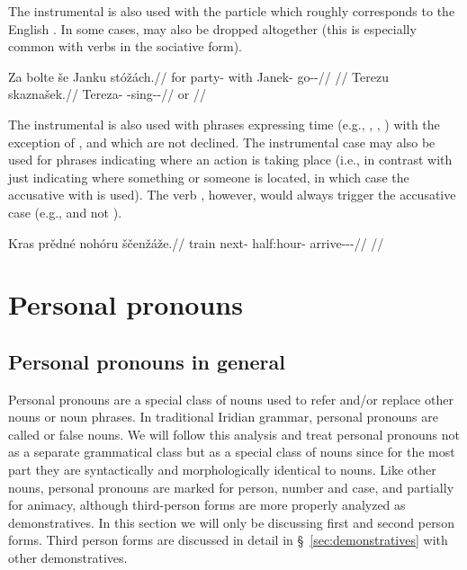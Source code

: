 The instrumental is also used with the particle  which roughly
corresponds to the English . In some cases,  may also be
dropped altogether (this is especially common with verbs in the sociative form).

\pex
\a\begingl
\gla Za bolte še Janku stóžách.//
\glb for party-\Acc{} with Janek-\Ins{} go-\Av{}-\Ctp{}//
\glft {}//
\endgl
\a\begingl
\gla Terezu skaznašek.//
\glb Tereza-\Ins{} \Soc{}-sing-\Av{}-\Pf{}//
\glft {} or //
\endgl
\xe

The instrumental is also used with phrases expressing time (e.g.,
, , ) with the
exception of ,  and
 which are not declined. The instrumental case may also
be used for phrases indicating where an action is taking place (i.e., in
contrast with just indicating where something or someone is located, in which
case the accusative with  is used). The verb , however, would always trigger the accusative case (e.g.,  and not ).

\pex
\begingl
\gla Kras prědné nohóru ščenžáže.//
\glb train next-\Att{} half:hour-\Ins{} arrive-\Av{}-\Ctp{}-\Quot{}//
\glft {}//
\endgl
\xe

\section{Personal pronouns}

\subsection{Personal pronouns in general}

Personal pronouns are a special class of nouns used to refer and/or replace
other nouns or noun phrases. In traditional Iridian grammar, personal pronouns
are called  or false nouns. We will follow this analysis and
treat personal pronouns not as a separate grammatical class but as a special
class of nouns since for the most part they are syntactically and
morphologically identical to nouns. Like other nouns, personal pronouns are
marked for person, number and case, and partially for animacy,
although third-person forms are more properly analyzed as demonstratives. In
this section we will only be discussing first and second person forms. Third
person forms are discussed in detail in \S~\ref{sec:demonstratives} with other
demonstratives.

